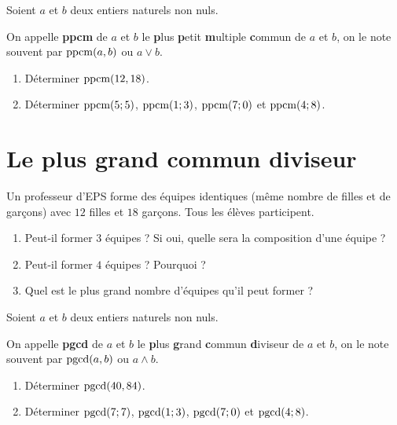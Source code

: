 \documentclass[10pt, a4paper]{article}
\begin{document}
\begin{Definition}[]
Soient $a$ et $b$ deux entiers naturels non nuls.

On appelle \textbf{ppcm} de $a$ et $b$ le \textbf{p}lus \textbf{p}etit \textbf{m}ultiple \textbf{c}ommun de $a$ et $b$, on le note souvent par
$\operatorname{ppcm}(a, b)$ ou $a \vee b$.
\end{Definition}

\begin{Application}[][10 min]
\begin{enumerate}[leftmargin=*,itemsep=0.5pt]
    \item Déterminer $\operatorname{ppcm}(12, 18)$.

    \item Déterminer $\operatorname{ppcm}(5;5)$, $\operatorname{ppcm}(1;3)$, $\operatorname{ppcm}(7;0)$ et $\operatorname{ppcm}(4;8)$.
\end{enumerate}
\end{Application}


\section{Le plus grand commun diviseur }

\begin{Activite}[][10 min]
Un professeur d'EPS forme des équipes identiques (même nombre de filles et de garçons) avec $12$ filles et $18$ garçons. Tous les élèves participent.

\begin{enumerate}[leftmargin=*,itemsep=0.5pt]
    \item Peut-il former $3$ équipes ? Si oui, quelle sera la composition d'une équipe ?
    \item Peut-il former $4$ équipes ? Pourquoi ?
    \item Quel est le plus grand nombre d'équipes qu'il peut former ?
\end{enumerate}
\end{Activite}

\begin{Definition}[]
Soient $a$ et $b$ deux entiers naturels non nuls.

On appelle \textbf{pgcd} de $a$ et $b$ le \textbf{p}lus \textbf{g}rand \textbf{c}ommun \textbf{d}iviseur  de $a$ et $b$, on le note souvent par
$\operatorname{pgcd}(a, b)$ ou $a \wedge b$.
\end{Definition}


\begin{Application}[][10 min]
\begin{enumerate}[leftmargin=*,itemsep=0.5pt]
    \item Déterminer $\operatorname{pgcd}(40, 84)$.

    \item Déterminer $\operatorname{pgcd}(7;7)$, $\operatorname{pgcd}(1;3)$,  $\operatorname{pgcd}(7;0)$ et $\operatorname{pgcd}(4;8)$.

\end{enumerate}
\end{Application}
\end{document}
